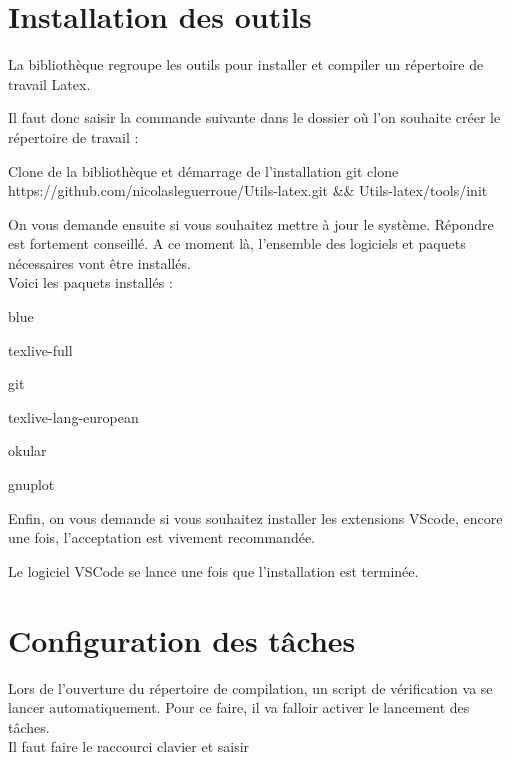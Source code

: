{\section{Installation des outils}


La bibliothèque  regroupe les outils pour installer et compiler un répertoire de travail Latex.

Il faut donc saisir la commande suivante dans le dossier où l'on souhaite créer le répertoire de travail : 

\begin{Bash}{Clone de la bibliothèque et démarrage de l'installation}
git clone https://github.com/nicolasleguerroue/Utils-latex.git && Utils-latex/tools/init
\end{Bash}

On vous demande ensuite si vous souhaitez mettre à jour le système.
Répondre  est fortement conseillé. A ce moment là, l'ensemble des logiciels et paquets nécessaires vont être installés.\\
Voici les paquets installés : \\
\begin{items}{blue}{\faviconLeaf}
\item texlive-full
\item git
\item texlive-lang-european
\item okular
\item gnuplot
\end{items}

Enfin, on vous demande si vous souhaitez installer les extensions VScode, encore une fois, l'acceptation est vivement recommandée.

Le logiciel VSCode se lance une fois que l'installation est terminée.


\section{Configuration des tâches}

Lors de l'ouverture du répertoire de compilation, un script de vérification va se lancer automatiquement.
Pour ce faire, il va falloir activer le lancement des tâches.\\ 
Il faut faire le raccourci clavier  et saisir  

}
